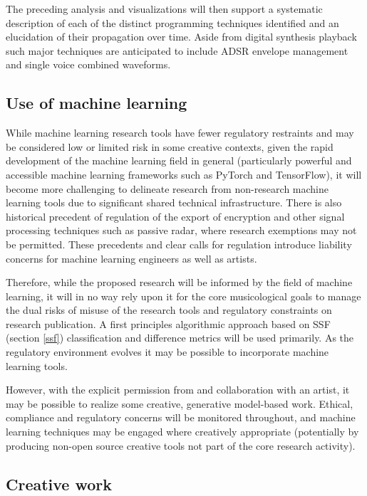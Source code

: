 \documentclass[10pt]{article}
\begin{document}
\begin{multicols*}{2}
The preceding analysis and visualizations will then support a systematic description of each of the distinct programming techniques identified and an elucidation of their propagation over time. Aside from digital synthesis playback such major techniques are anticipated to include ADSR envelope management and single voice combined waveforms.

\subsection{Use of machine learning}
\label{applyml}

While machine learning research tools have fewer regulatory restraints and may be considered low or limited risk in some creative contexts, given the rapid development of the machine learning field in general (particularly powerful and accessible machine learning frameworks such as PyTorch and TensorFlow), it will become more challenging to delineate research from non-research machine learning tools due to significant shared technical infrastructure. There is also historical precedent of regulation of the export of encryption and other signal processing techniques such as passive radar\cite{munitions}, where research exemptions may not be permitted. These precedents and clear calls for regulation introduce liability concerns for machine learning engineers as well as artists.

Therefore, while the proposed research will be informed by the field of machine learning, it will in no way rely upon it for the core musicological goals to manage the dual risks of misuse of the research tools and regulatory constraints on research publication. A first principles algorithmic approach based on SSF (section \ref{ssf}) classification and difference metrics will be used primarily. As the regulatory environment evolves it may be possible to incorporate machine learning tools.

However, with the explicit permission from and collaboration with an artist, it may be possible to realize some creative, generative model-based work. Ethical, compliance and regulatory concerns will be monitored throughout, and machine learning techniques may be engaged where creatively appropriate (potentially by producing non-open source creative tools not part of the core research activity).

\subsection{Creative work}


\end{multicols*}
\end{document}
